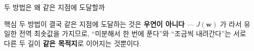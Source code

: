 \begin{frame}{두 방법은 왜 같은 지점에 도달할까}
  \begin{block}{핵심}
    두 방법이 결국 같은 지점에 도달하는 것은 \textbf{우연이 아니다} ---
    $J(\boldsymbol{w})$ 가 라서 유일한 전역 최솟값을 가지므로,
    ``미분해서 한 번에 푼다''와 ``조금씩 내려간다''는 서로 다른
    두 길이 \textbf{같은 목적지}로 이어지는 것뿐이다.
  \end{block}
\end{frame}

